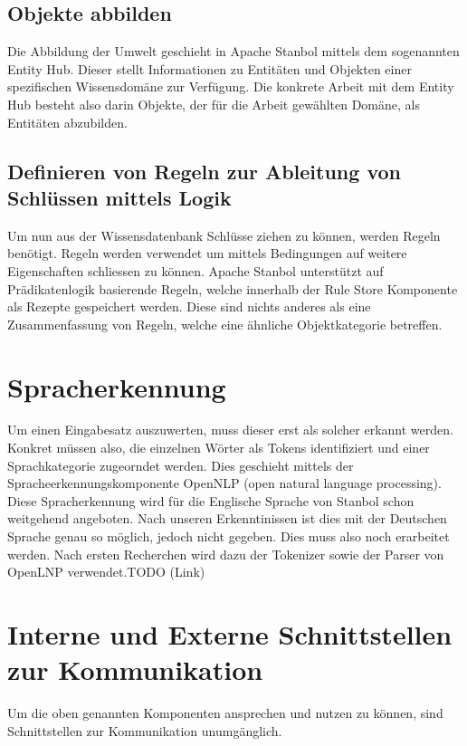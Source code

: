 \subsection{Objekte abbilden}
\label{sec:architektur_wissensdatenbank_Objekte}
Die Abbildung der Umwelt geschieht in Apache Stanbol mittels dem sogenannten Entity Hub.
Dieser stellt Informationen zu Entitäten und Objekten einer spezifischen Wissensdomäne zur Verfügung. Die konkrete Arbeit mit dem Entity Hub besteht also darin Objekte, der für die Arbeit gewählten Domäne, als Entitäten abzubilden.
\subsection{Definieren von Regeln zur Ableitung von Schlüssen mittels Logik}
\label{sec:architektur_regeln}
Um nun aus der Wissensdatenbank Schlüsse ziehen zu können, werden Regeln benötigt. Regeln werden verwendet um mittels Bedingungen auf weitere Eigenschaften schliessen zu können.
Apache Stanbol unterstützt auf Prädikatenlogik basierende Regeln, welche innerhalb der Rule Store Komponente als Rezepte gespeichert werden. Diese sind nichts anderes als eine Zusammenfassung von Regeln, welche eine ähnliche Objektkategorie betreffen.

\section{Spracherkennung}
\label{sec:architektur_spracherkennung}
Um einen Eingabesatz auszuwerten, muss dieser erst als solcher erkannt werden. Konkret müssen also, die einzelnen Wörter als Tokens identifiziert und einer Sprachkategorie zugeorndet werden. Dies geschieht mittels der Spracheerkennungskomponente OpenNLP (open natural language processing). Diese Spracherkennung wird für die Englische Sprache von Stanbol schon weitgehend angeboten. Nach unseren Erkenntinissen ist dies mit der Deutschen Sprache genau so möglich, jedoch nicht gegeben. Dies muss also noch erarbeitet werden. Nach ersten Recherchen wird dazu der Tokenizer sowie der Parser von OpenLNP verwendet.TODO (Link)

\section{Interne und Externe Schnittstellen zur Kommunikation}
\label{sec:architektur_schnittstellen}
Um die oben genannten Komponenten ansprechen und nutzen zu können, sind Schnittstellen zur Kommunikation unumgänglich.

